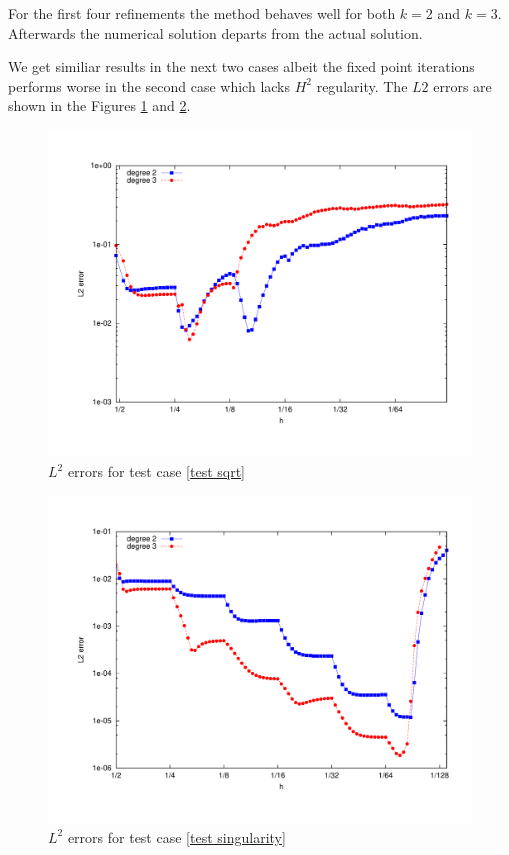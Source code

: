  For the first four refinements the method behaves well for both $k=2$ and $k=3$. Afterwards the numerical solution departs from the actual solution.
 
 We get similiar results in the next two cases albeit the fixed point iterations performs worse in the second case which lacks $H^2$ regularity. The $L2$ errors are shown in the Figures \ref{fig: l2 errors test sqrt ourMethod} and \ref{fig: l2 errors test singularity ourMethod}.
 
\begin{figure}[H]
\centering
	\includegraphics[scale =0.4]{plots/MA3.pdf}
	\caption{$L^2$ errors for test case \ref{test sqrt}}
	\label{fig: l2 errors test sqrt ourMethod}
\end{figure}


\begin{figure}[H]
\centering
	\includegraphics[scale =0.4]{plots/MA2.pdf}
	\caption{$L^2$ errors for test case \ref{test singularity}}
	\label{fig: l2 errors test singularity ourMethod}
\end{figure}

